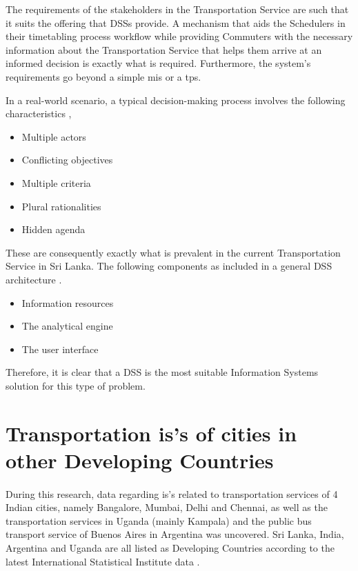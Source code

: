 The requirements of the stakeholders in the Transportation Service are such that it suits the offering that DSSs provide. A mechanism that aids the Schedulers in their timetabling process workflow while providing Commuters with the necessary information about the Transportation Service that helps them arrive at an informed decision is exactly what is required. Furthermore, the system's requirements go beyond a simple \acrshort{mis} or a \acrshort{tps}.

In a real-world scenario, a typical decision-making process involves the following characteristics \cite{Fedra2000},

\begin {itemize}
\item Multiple actors
\item Conflicting objectives
\item Multiple criteria
\item Plural rationalities
\item Hidden agenda
\end {itemize}

These are consequently exactly what is prevalent in the current Transportation Service in Sri Lanka.  The following components as included in a general DSS architecture \cite{Fedra2000}.

\begin {itemize}
\item Information resources
\item The analytical engine
\item The user interface
\end {itemize}

Therefore, it is clear that a DSS is the most suitable Information Systems solution for this type of problem.


\section{Transportation \acrshort{is}'s of cities in other Developing Countries}

\paragraph{} During this research, data regarding \acrshort{is}'s related to transportation services of 4 Indian cities, namely Bangalore, Mumbai, Delhi and Chennai, as well as the transportation services in Uganda (mainly Kampala) and the public bus transport service of Buenos Aires in Argentina was uncovered. Sri Lanka, India, Argentina and Uganda are all listed as Developing Countries according to the latest International Statistical Institute data \cite{ISI2013}.

